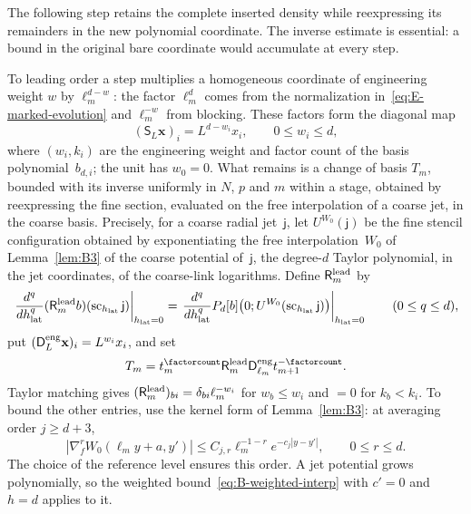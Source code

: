 The following step retains the complete inserted density while reexpressing its remainders in the new polynomial coordinate. The inverse estimate is essential: a bound in the original bare coordinate would accumulate at every step.

To leading order a step multiplies a homogeneous coordinate of engineering weight $w$ by $\ell_m^{d-w}$: the factor $\ell_m^d$ comes from the normalization in~\eqref{eq:E-marked-evolution} and $\ell_m^{-w}$ from blocking. These factors form the diagonal map
\begin{equation*}
 (\mathsf S_L\mathbf x)_i=L^{d-w_i}x_i,
 \qquad 0\le w_i\le d,
\end{equation*}
where $(w_i,k_i)$ are the engineering weight and factor count of the basis polynomial~$b_{d,i}$; the unit has $w_0=0$. What remains is a change of basis $T_m$, bounded with its inverse uniformly in $N$, $p$ and $m$ within a stage, obtained by reexpressing the fine section, evaluated on the free interpolation of a coarse jet, in the coarse basis. Precisely, for a coarse radial jet~$\mathsf j$, let $U^{W_0}(\mathsf j)$ be the fine stencil configuration obtained by exponentiating the free interpolation~$W_0$ of Lemma~\ref{lem:B3} of the coarse potential of~$\mathsf j$, the degree-$d$ Taylor polynomial, in the jet coordinates, of the coarse-link logarithms. Define $\mathsf R^{\rm lead}_m$ by
\begin{equation*}
 \left.\frac{d^q}{dh_{\rm lat}^q}(\mathsf R^{\rm lead}_mb)(\operatorname{sc}_{h_{\rm lat}}\mathsf j)\right|_{h_{\rm lat}=0}
 =\left.\frac{d^q}{dh_{\rm lat}^q}P_d[b]\bigl(0;U^{W_0}(\operatorname{sc}_{h_{\rm lat}}\mathsf j)\bigr)\right|_{h_{\rm lat}=0}
 \qquad(0\le q\le d),
\end{equation*}
put $(\mathsf D^{\rm eng}_L\mathbf x)_i=L^{w_i}x_i$, and set
\begin{equation*}
 T_m=t_m^{\factorcount}\mathsf R^{\rm lead}_m\mathsf D^{\rm eng}_{\ell_m}t_{m+1}^{-\factorcount}.
\end{equation*}
Taylor matching gives $(\mathsf R^{\rm lead}_m)_{bi}=\delta_{bi}\ell_m^{-w_i}$ for $w_b\le w_i$ and $=0$ for $k_b<k_i$. To bound the other entries, use the kernel form of Lemma~\ref{lem:B3}: at averaging order $j\ge d+3$,
\begin{equation*}
 |\nabla_f^rW_0(\ell_my+a,y')|
 \le C_{j,r}\ell_m^{-1-r}e^{-c_j|y-y'|},\qquad 0\le r\le d.
\end{equation*}
The choice of the reference level ensures this order. A jet potential grows polynomially, so the weighted bound~\eqref{eq:B-weighted-interp} with $c'=0$ and $h=d$ applies to it.
